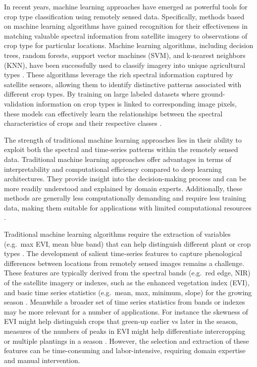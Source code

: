 \documentclass[
  journal,
  twocolumn]{IEEEtran}
\begin{document}
In recent years, machine learning approaches have emerged as powerful
tools for crop type classification using remotely sensed data.
Specifically, methods based on machine learning algorithms have gained
recognition for their effectiveness in matching valuable spectral
information from satellite imagery to observations of crop type for
particular locations. Machine learning algorithms, including decision
trees, random forests, support vector machines (SVM), and k-nearest
neighbors (KNN), have been successfully used to classify imagery into
unique agricultural types
\citep{ibrahim2021mapping, begue2018remote, delince2017handbook}. These
algorithms leverage the rich spectral information captured by satellite
sensors, allowing them to identify distinctive patterns associated with
different crop types. By training on large labeled datasets where
ground-validation information on crop types is linked to corresponding
image pixels, these models can effectively learn the relationships
between the spectral characteristics of crops and their respective
classes \citep{begue2018remote}.

The strength of traditional machine learning approaches lies in their
ability to exploit both the spectral and time-series patterns within the
remotely sensed data. Traditional machine learning approaches offer
advantages in terms of interpretability and computational efficiency
compared to deep learning architectures. They provide insight into the
decision-making process and can be more readily understood and explained
by domain experts. Additionally, these methods are generally less
computationally demanding and require less training data, making them
suitable for applications with limited computational resources
\citep{hohl2024recent, rs13132591, agriculture13050965, LI2023103345, MA2019166}.

Traditional machine learning algorithms require the extraction of
variables (e.g.~max EVI, mean blue band) that can help distinguish
different plant or crop types \citep{begue2018remote}. The development
of salient time-series features to capture phenological differences
between locations from remotely sensed images remains a challenge. These
features are typically derived from the spectral bands (e.g.~red edge,
NIR) of the satellite imagery or indexes, such as the enhanced
vegetation index (EVI), and basic time series statistics (e.g.~mean,
max, minimum, slope) for the growing season \citep{morton2006cropland}.
Meanwhile a broader set of time series statistics from bands or indexes
may be more relevant for a number of applications. For instance the
skewness of EVI might help distinguish crops that green-up earlier vs
later in the season, measures of the numbers of peaks in EVI might help
differentiate intercropping or multiple plantings in a season
\citep{begue2018remote}. However, the selection and extraction of these
features can be time-consuming and labor-intensive, requiring domain
expertise and manual intervention.
\end{document}

